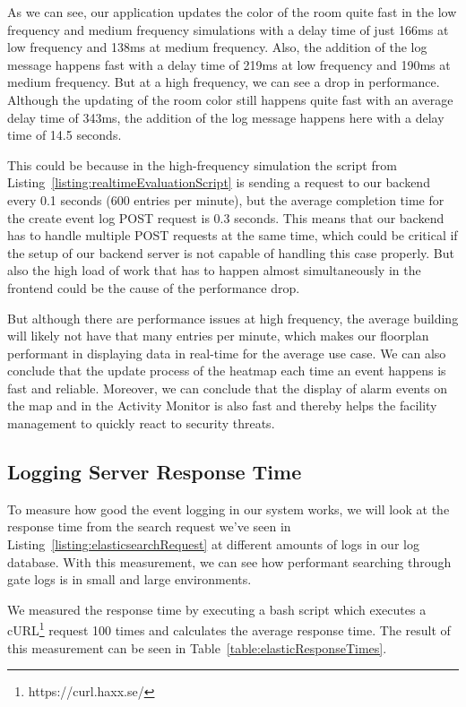 As we can see, our application updates the color of the room quite fast in the low frequency and medium frequency simulations with a delay time of just 166ms at low frequency and 138ms at medium frequency.
Also, the addition of the log message happens fast with a delay time of 219ms at low frequency and 190ms at medium frequency.
But at a high frequency, we can see a drop in performance. Although the updating of the room color still happens quite fast with an average delay time of 343ms, the addition of the log message happens here with a delay time of 14.5 seconds. 

This could be because in the high-frequency simulation the script from Listing~\ref{listing:realtimeEvaluationScript} is sending a request to our backend every 0.1 seconds (600 entries per minute), but the average completion time for the create event log POST request is 0.3 seconds. This means that our backend has to handle multiple POST requests at the same time, which could be critical if the setup of our backend server is not capable of handling this case properly. But also the high load of work that has to happen almost simultaneously in the frontend could be the cause of the performance drop. 

But although there are performance issues at high frequency, the average building will likely not have that many entries per minute, which makes our floorplan performant in displaying data in real-time for the average use case. We can also conclude that the update process of the heatmap each time an event happens is fast and reliable. Moreover, we can conclude that the display of alarm events on the map and in the Activity Monitor is also fast and thereby helps the facility management to quickly react to security threats.

\subsection{Logging Server Response Time}

To measure how good the event logging in our system works, we will look at the response time from the search request we've seen in Listing~\ref{listing:elasticsearchRequest}
at different amounts of logs in our log database. With this measurement, we can see how performant searching through gate logs is in small and large environments. 

We measured the response time by executing a bash script which executes a cURL\footnote{https://curl.haxx.se/} request 100 times and calculates the average response time. 
The result of this measurement can be seen in Table~\ref{table:elasticResponseTimes}.
 
